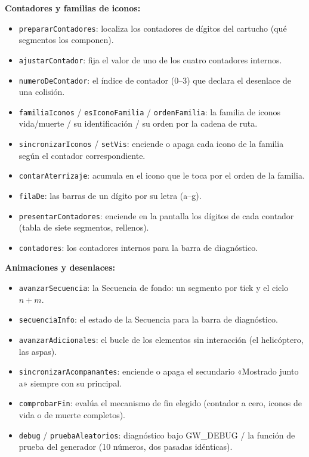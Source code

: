 \documentclass[../main.tex]{subfiles}
\begin{document}
\textbf{Contadores y familias de iconos:}
\begin{itemize}
	\item \texttt{prepararContadores}: localiza los contadores de
	dígitos del cartucho (qué segmentos los componen).
	\item \texttt{ajustarContador}: fija el valor de uno de los cuatro
	contadores internos.
	\item \texttt{numeroDeContador}: el índice de contador (0--3) que
	declara el desenlace de una colisión.
	\item \texttt{familiaIconos} / \texttt{esIconoFamilia} /
	\texttt{ordenFamilia}: la familia de iconos vida/muerte / su
	identificación / su orden por la cadena de ruta.
	\item \texttt{sincronizarIconos} / \texttt{setVis}: enciende o apaga
	cada icono de la familia según el contador correspondiente.
	\item \texttt{contarAterrizaje}: acumula en el icono que le toca por
	el orden de la familia.
	\item \texttt{filaDe}: las barras de un dígito por su letra (a--g).
	\item \texttt{presentarContadores}: enciende en la pantalla los
	dígitos de cada contador (tabla de siete segmentos, rellenos).
	\item \texttt{contadores}: los contadores internos para la barra de
	diagnóstico.
\end{itemize}

\textbf{Animaciones y desenlaces:}
\begin{itemize}
	\item \texttt{avanzarSecuencia}: la Secuencia de fondo: un segmento
	por tick y el ciclo $n + m$.
	\item \texttt{secuenciaInfo}: el estado de la Secuencia para la
	barra de diagnóstico.
	\item \texttt{avanzarAdicionales}: el bucle de los elementos sin
	interacción (el helicóptero, las aspas).
	\item \texttt{sincronizarAcompanantes}: enciende o apaga el
	secundario «Mostrado junto a» siempre con su principal.
	\item \texttt{comprobarFin}: evalúa el mecanismo de fin elegido
	(contador a cero, iconos de vida o de muerte completos).
	\item \texttt{debug} / \texttt{pruebaAleatorios}: diagnóstico bajo
	GW\_DEBUG / la función de prueba del generador (10 números, dos
	pasadas idénticas).
\end{itemize}
\end{document}
